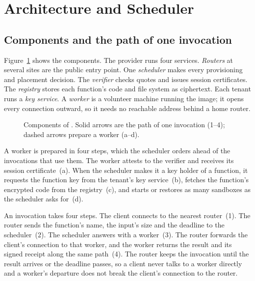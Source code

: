 \section{Architecture and Scheduler}
\label{sec:design}

\subsection{Components and the path of one invocation}
\label{sec:arch}

Figure~\ref{fig:arch} shows the components. The provider runs four services. \emph{Routers} at several sites are the
public entry point. One \emph{scheduler} makes every provisioning and placement decision. The \emph{verifier} checks
quotes and issues session certificates. The \emph{registry} stores each function's code and file system as
ciphertext. Each tenant runs a \emph{key service}. A \emph{worker} is a volunteer machine running the image; it
opens every connection outward, so it needs no reachable address behind a home router.

\begin{figure}[t]
\centering

\caption{Components of \voss{}. Solid arrows are the path of one invocation (1--4); dashed arrows prepare a worker
(a--d).}
\label{fig:arch}
\end{figure}

A worker is prepared in four steps, which the scheduler orders ahead of the invocations that use them. The worker
attests to the verifier and receives its session certificate~(a). When the scheduler makes it a key holder of a
function, it requests the function key from the tenant's key service~(b), fetches the function's encrypted code from
the registry~(c), and starts or restores as many sandboxes as the scheduler asks for~(d).

An invocation takes four steps. The client connects to the nearest router~(1). The router sends the function's name,
the input's size and the deadline to the scheduler~(2). The scheduler answers with a worker~(3). The router forwards
the client's connection to that worker, and the worker returns the result and its signed receipt along the same
path~(4). The router keeps the invocation until the result arrives or the deadline passes, so a client never talks to
a worker directly and a worker's departure does not break the client's connection to the router.

